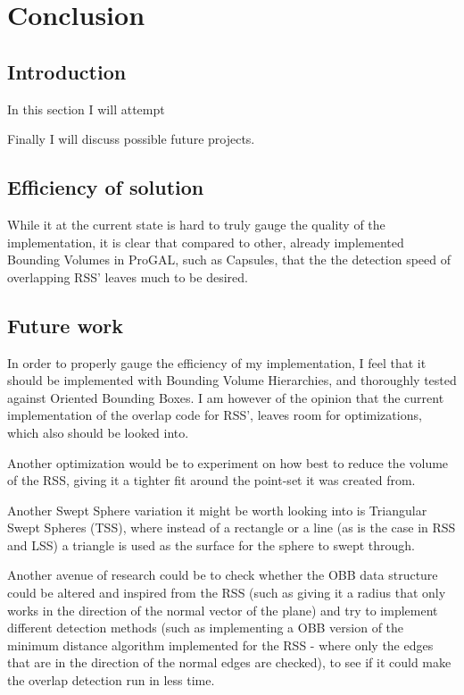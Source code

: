 
\section{Conclusion}
\label{conclusion}
\subsection{Introduction}
In this section I will attempt 

Finally I will discuss possible future projects.

\subsection{Efficiency of solution}
While it at the current state is hard to truly gauge the quality of the implementation, it is clear that compared to other, already implemented Bounding Volumes in ProGAL, such as Capsules, that the the detection speed of overlapping RSS' leaves much to be desired.

\subsection{Future work}
In order to properly gauge the efficiency of my implementation, I feel that it should be implemented with Bounding Volume Hierarchies, and thoroughly tested against Oriented Bounding Boxes. I am however of the opinion that the current implementation of the overlap code for RSS', leaves room for optimizations, which also should be looked into. 

Another optimization would be to experiment on how best to reduce the volume of the RSS, giving it a tighter fit around the point-set it was created from.

Another Swept Sphere variation it might be worth looking into is Triangular Swept Spheres (TSS), where instead of a rectangle or a line (as is the case in RSS and LSS) a triangle is used as the surface for the sphere to swept through. 

Another avenue of research could be to check whether the OBB data structure could be altered and inspired from the RSS (such as giving it a radius that only works in the direction of the normal vector of the plane) and try to implement different detection methods (such as implementing a OBB version of the minimum distance algorithm implemented for the RSS - where only the edges that are in the direction of the normal edges are checked), to see if it could make the overlap detection run in less time.
